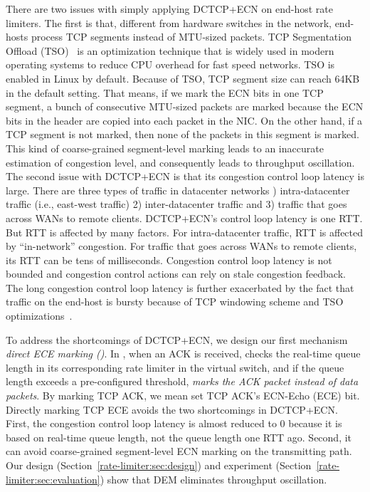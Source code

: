 There are two issues with simply applying DCTCP+ECN on end-host rate limiters. The first is that, different from
hardware switches in the network, end-hosts process TCP segments instead of MTU-sized packets. 
TCP Segmentation Offload (TSO)~\cite{tcp-segment-offload} is an optimization technique 
that is widely used in modern operating systems to reduce CPU overhead
for fast speed networks. TSO is enabled in Linux by default. Because of TSO, TCP segment size can reach
64KB in the default setting. That means, if we mark the ECN bits in one TCP segment, a bunch of 
consecutive MTU-sized packets are marked because the ECN bits in the header are copied into each packet in the NIC.
On the other hand, if a TCP segment is not marked, then none of the packets in this segment is marked. This kind of 
coarse-grained segment-level marking leads to an inaccurate estimation of congestion level, and consequently 
leads to throughput oscillation.
The second issue with DCTCP+ECN is that its congestion control loop latency is large. There are three types of 
traffic in datacenter networks \textemdash\xspace 1) intra-datacenter traffic (i.e., east-west traffic) 2) inter-datacenter
traffic and 3) traffic that goes across WANs to remote clients. DCTCP+ECN's control loop latency is one RTT.
But RTT is affected by many factors. For intra-datacenter traffic, RTT is affected by ``in-network'' congestion.
For traffic that goes across WANs to remote clients, its RTT can be tens of milliseconds.
Congestion control loop latency is not bounded and congestion control actions can rely on stale congestion feedback.
The long congestion control loop latency is further exacerbated by the fact that traffic on the end-host is bursty
because of TCP windowing scheme and TSO optimizations~\cite{kapoor2013bullet}.


To address the shortcomings of DCTCP+ECN, 
we design our first mechanism \textemdash\xspace \textit{direct ECE marking (\nameone)}. 
In \nameone, when an ACK is received, \nameone checks the real-time queue length in its corresponding rate limiter
in the virtual switch, 
and if the queue length exceeds a pre-configured threshold, \nameone \textit{marks the ACK packet instead of data packets}. 
By marking TCP ACK, we mean set TCP ACK's ECN-Echo (ECE) bit.
Directly marking TCP ECE avoids the two shortcomings in DCTCP+ECN. First, the congestion control loop
latency is almost reduced to 0 because it is based on real-time queue length, not the queue length one RTT ago.
Second, it can avoid coarse-grained segment-level ECN marking on the transmitting path.
Our design (Section~\ref{rate-limiter:sec:design}) and experiment (Section~\ref{rate-limiter:sec:evaluation}) show that 
DEM eliminates throughput oscillation.
 

